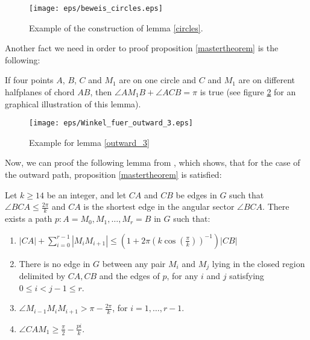 \begin{figure}[h!]
\centering
\texttt{[image: eps/beweis\_circles.eps]}
\caption{Example of the construction of lemma \ref{circles}.}
\label{fig:beweis_circles}
\end{figure}
Another fact we need in order to proof proposition \ref{mastertheorem} is the following:
\begin{fact}
\label{outward_3}
If four points $A $, $B $, $C $ and $M_1 $ are on one circle and $C $ and $M_1 $ are on different halfplanes of chord $AB $, then $\angle{AM_1B} + \angle{ACB} =\pi $ is true (see figure \ref{fig:winkel_fuer_outward_3} for an graphical illustration of this lemma).
\end{fact}

\begin{figure}[h!]
\centering
\texttt{[image: eps/Winkel\_fuer\_outward\_3.eps]}
\caption{Example for lemma \ref{outward_3} }
\label{fig:winkel_fuer_outward_3}
\end{figure}

Now, we can proof the following lemma from \cite{kanj}, which shows, that for the case of the outward path, proposition \ref{mastertheorem} is satisfied:

\begin{lemma}
Let $k \geq 14$ be an integer, and let $CA $ and $CB $ be edges in $G $ such that $\angle{BCA} \leq \frac{2\pi}{k} $ and $CA $ is the shortest edge in the angular sector $\angle{BCA} $. There exists a path $p : A=M_0, M_1, \dotsc, M_r=B $ in $G $ such that:
\begin{enumerate}
\renewcommand{\labelenumi}{(\roman{enumi})}
\item $|CA| + \sum_{i=0}^{r-1}|M_iM_{i+1}| \leq (1+2\pi(k \cos(\frac{\pi}{k}))^{-1})|CB|$
\item There is no edge in $G $ between any pair $M_i $ and $M_j $ lying in the closed region delimited by $CA, CB $ and the edges of $p $, for any $i $ and $j $ satisfying $0 \leq i < j -1 \leq r $.
\item $\angle{M_{i-1}M_iM_{i+1}} > \pi - \frac{2\pi}{k} $, for $i=1,\dotsc,r-1 $.
\item $\angle{CAM_1} \geq \frac{\pi}{2} - \frac{pi}{k} $.
\end{enumerate}	 
\end{lemma}

